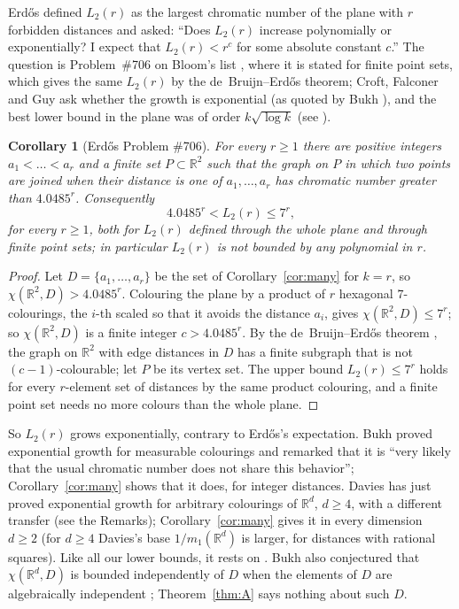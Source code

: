 \documentclass[11pt,a4paper]{amsart}
\newtheorem{corollary}[theorem]{Corollary}
\theoremstyle{definition}
\theoremstyle{remark}
\newcommand{\R}{\mathbb{R}}
\begin{document}
Erd\H{o}s \cite{Erdos81} defined $L_2(r)$ as the largest chromatic number of the plane with $r$ forbidden distances
and asked: ``Does $L_2(r)$ increase polynomially or exponentially? I expect that $L_2(r)<r^c$ for some absolute
constant $c$.'' The question is Problem~\#706 on Bloom's list \cite{EP706}, where it is stated for finite point sets,
which gives the same $L_2(r)$ by the de~Bruijn--Erd\H{o}s theorem; Croft, Falconer and Guy ask whether the growth is
exponential \cite[Problem G11]{CFG} (as quoted by Bukh \cite{Bukh}), and the best lower bound in the plane was of order
$k\sqrt{\log k}$ (see \cite{Bukh,Naslund}).

\begin{corollary}[Erd\H{o}s Problem \#706]\label{cor:706}
For every $r\ge1$ there are positive integers $a_1<\dots<a_r$ and a finite set $P\subset\R^2$ such that the graph on
$P$ in which two points are joined when their distance is one of $a_1,\dots,a_r$ has chromatic number greater than
$4.0485^r$. Consequently
\[
4.0485^r<L_2(r)\le7^r ,
\]
for every $r\ge1$, both for $L_2(r)$ defined through the whole plane and through finite point sets; in particular
$L_2(r)$ is not bounded by any polynomial in $r$.
\end{corollary}

\begin{proof}
Let $D=\{a_1,\dots,a_r\}$ be the set of Corollary~\ref{cor:many} for $k=r$, so $\chi(\R^2,D)>4.0485^r$. Colouring the
plane by a product of $r$ hexagonal $7$-colourings, the $i$-th scaled so that it avoids the distance $a_i$, gives
$\chi(\R^2,D)\le7^r$; so $\chi(\R^2,D)$ is a finite integer $c>4.0485^r$. By the de~Bruijn--Erd\H{o}s theorem
\cite{dBE}, the graph on $\R^2$ with edge distances in $D$ has a finite subgraph that is not $(c-1)$-colourable; let $P$
be its vertex set. The upper bound $L_2(r)\le7^r$ holds for every $r$-element set of distances by the same product
colouring, and a finite point set needs no more colours than the whole plane.
\end{proof}

So $L_2(r)$ grows exponentially, contrary to Erd\H{o}s's expectation. Bukh \cite{Bukh} proved exponential growth for
measurable colourings and remarked that it is ``very likely that the usual chromatic number does not share this
behavior''; Corollary~\ref{cor:many} shows that it does, for integer distances. Davies \cite{Davies} has just proved
exponential growth for arbitrary colourings of $\R^d$, $d\ge4$, with a different transfer (see the Remarks);
Corollary~\ref{cor:many} gives it in every dimension $d\ge2$ (for $d\ge4$ Davies's base $1/m_1(\R^d)$ is
larger, for distances with rational squares). Like all our lower bounds, it rests on
\cite[Thm.~2.3]{OpenAI}. Bukh also conjectured that $\chi(\R^d,D)$ is bounded independently of $D$ when the elements
of $D$ are algebraically independent \cite{Bukh}; Theorem~\ref{thm:A} says nothing about such $D$.
\end{document}
